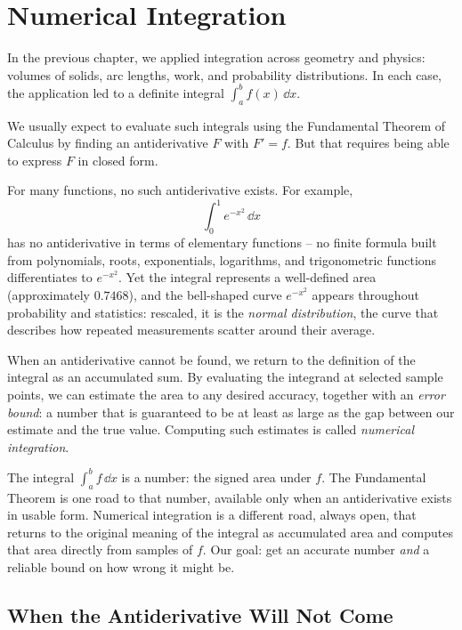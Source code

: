 \chapter{Numerical Integration}

In the previous chapter, we applied integration across geometry and physics:
volumes of solids, arc lengths, work, and probability distributions. In each
case, the application led to a definite integral $\int_a^b f(x)\,\dd x$.

We usually expect to evaluate such integrals using the Fundamental Theorem of
Calculus by finding an antiderivative $F$ with $F' = f$. But that requires being
able to express $F$ in closed form.

For many functions, no such antiderivative exists. For example,
\[
\int_0^1 e^{-x^2}\,\dd x
\]
has no antiderivative in terms of elementary functions -- no finite formula built
from polynomials, roots, exponentials, logarithms, and trigonometric functions
differentiates to $e^{-x^2}$. Yet the integral represents a well-defined area
(approximately $0.7468$), and the bell-shaped curve $e^{-x^2}$ appears throughout probability
and statistics: rescaled, it is the \emph{normal distribution}, the curve that describes how
repeated measurements scatter around their average.

When an antiderivative cannot be found, we return to the definition of the
integral as an accumulated sum. By evaluating the integrand at selected sample
points, we can estimate the area to any desired accuracy, together with an
\emph{error bound}: a number that is guaranteed to be at least as large as the
gap between our estimate and the true value. Computing such estimates is called
\emph{numerical integration}.

\begin{focusbox}
The integral $\int_a^b f\,\dd x$ is a number: the signed area under $f$. The Fundamental Theorem is one road to that number, available only when an antiderivative exists in usable form. Numerical integration is a different road, always open, that returns to the original meaning of the integral as accumulated area and computes that area directly from samples of $f$. Our goal: get an accurate number \emph{and} a reliable bound on how wrong it might be.
\end{focusbox}

\section{When the Antiderivative Will Not Come}
\label{ch27:noanti}

